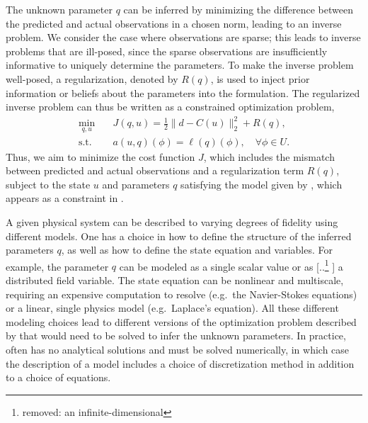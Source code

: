 \documentclass[review,sort&compress]{elsarticle}
\providecommand{\DIFaddtex}[1]{{\protect\color{blue} \sf #1}} %
\providecommand{\DIFdeltex}[1]{{\protect\color{red} [..\footnote{removed: #1} ]}} %
\providecommand{\DIFaddbegin}{} %
\providecommand{\DIFaddend}{} %
\providecommand{\DIFdelbegin}{} %
\providecommand{\DIFdelend}{} %
\providecommand{\DIFadd}[1]{\texorpdfstring{\DIFaddtex{#1}}{#1}} %
\providecommand{\DIFdel}[1]{\texorpdfstring{\DIFdeltex{#1}}{}} %
\newcommand{\DIFscaledelfig}{0.5}
\newlength{\DIFdelgraphicswidth} %
\newlength{\DIFdelgraphicsheight} %
\newcommand{\DIFaddincludegraphics}[2][]{{\color{blue}\fbox{\DIFOincludegraphics[#1]{#2}}}} %
\newcommand{\DIFdelincludegraphics}[2][]{%
\sbox{\DIFdelgraphicsbox}{\DIFOincludegraphics[#1]{#2}}%
\settoboxwidth{\DIFdelgraphicswidth}{\DIFdelgraphicsbox} %
\settoboxtotalheight{\DIFdelgraphicsheight}{\DIFdelgraphicsbox} %
\scalebox{\DIFscaledelfig}{%
\parbox[b]{\DIFdelgraphicswidth}{\usebox{\DIFdelgraphicsbox}\\[-\baselineskip] \rule{\DIFdelgraphicswidth}{0em}}\llap{\resizebox{\DIFdelgraphicswidth}{\DIFdelgraphicsheight}{%
\setlength{\unitlength}{\DIFdelgraphicswidth}%
\begin{picture}(1,1)%
\thicklines\linethickness{2pt} %
{\color[rgb]{1,0,0}\put(0,0){\framebox(1,1){}}}%
{\color[rgb]{1,0,0}\put(0,0){\line( 1,1){1}}}%
{\color[rgb]{1,0,0}\put(0,1){\line(1,-1){1}}}%
\end{picture}%
}\hspace*{3pt}}} %
} %
\DeclareRobustCommand{\DIFaddbegin}{\DIFOaddbegin \let\includegraphics\DIFaddincludegraphics} %
\DeclareRobustCommand{\DIFaddend}{\DIFOaddend \let\includegraphics\DIFOincludegraphics} %
\DeclareRobustCommand{\DIFdelbegin}{\DIFOdelbegin \let\includegraphics\DIFdelincludegraphics} %
\DeclareRobustCommand{\DIFdelend}{\DIFOaddend \let\includegraphics\DIFOincludegraphics} %
\begin{document}
The unknown parameter $q$ can be inferred by minimizing the difference between the predicted and actual observations in a chosen norm, leading to an inverse problem. We consider the case where observations are sparse; this leads to inverse problems that are ill-posed, since the sparse observations are insufficiently informative to uniquely determine the parameters. To make the inverse problem well-posed, a regularization, denoted by $R(q)$, is used to inject prior information or beliefs about the parameters into the formulation. The regularized inverse problem can thus be written as a constrained optimization problem,
%
\begin{subequations}
\label{eq:invOpt}
\begin{align}
\min\limits_{q,u} & \quad J(q,u)=\frac{1}{2}\|d-C(u)\|_2^2 + R(q), \label{eq:invOpt_obj} \\
\textrm{s.t. }& \quad a(u,q)(\phi)=\ell(q)(\phi),\quad\forall\phi\in U. \label{eq:invOpt_cons}
\end{align}
\end{subequations}
%
Thus, we aim to minimize the cost function $J$, which includes the mismatch between predicted and actual observations and a regularization term $R(q)$, subject to the state $u$ and parameters $q$ satisfying the model given by , which appears as a constraint in .

A given physical system can be described to varying degrees of fidelity using different models. One has a choice in how to define the structure of the inferred parameters $q$, as well as how to define the state equation and variables. For example, the parameter $q$ can be modeled as a single scalar value or as \DIFdelbegin \DIFdel{an infinite-dimensional }\DIFdelend \DIFaddbegin \DIFadd{a }\DIFaddend distributed field variable. The state equation can be nonlinear and multiscale, requiring an expensive computation to resolve (e.g.\ the Navier-Stokes equations) or a linear, single physics model (e.g.\ Laplace's equation). All these different modeling choices lead to different versions of the optimization problem described by  that would need to be solved to infer the unknown parameters. \DIFaddbegin \DIFadd{In practice,  often has no analytical solutions and must be solved numerically, in which case the description of a model includes a choice of discretization method in addition to a choice of equations.
}\DIFaddend 
\end{document}

